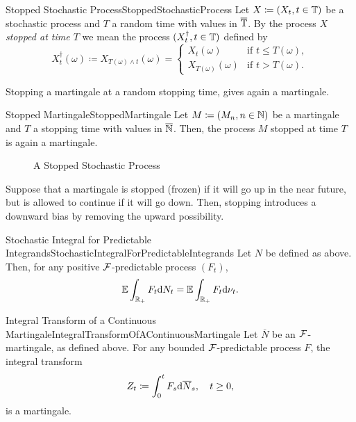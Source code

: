 \begin{defn}{Stopped Stochastic Process}{StoppedStochasticProcess}
	Let \(X \coloneqq (X_t, t \in \mathbb{T})\) be a stochastic process and \(T\) a random time with values in \(\overline{\mathbb{T}}\). By the process \(X\) \emph{stopped at time \(T\)} we mean the process \((X^\dagger_t, t \in \mathbb{T})\) defined by
	\begin{equation}\label{eq:StoppedProcessDefinition}
		X^\dagger_t(\omega) \coloneqq X_{T(\omega) \land t}(\omega) =
		\begin{cases}
			X_t(\omega)           & \text{if } t \le T(\omega), \\
			X_{T(\omega)}(\omega) & \text{if } t > T(\omega).
		\end{cases}
	\end{equation}
\end{defn}

Stopping a martingale at a random stopping time, gives again a martingale.

\begin{thm}{Stopped Martingale}{StoppedMartingale}
	Let \(M \coloneqq (M_n, n \in \mathbb{N})\) be a martingale and \(T\) a stopping time with values in \(\overline{\mathbb{N}}\). Then, the process \(M\) stopped at time \(T\) is again a martingale.
\end{thm}

\begin{figure}[H]
	\hfuzz=20pt\relax
	\centering
	
	\caption[Stopped stochastic process]{A Stopped Stochastic Process}\label{fig:StoppedStochasticProcess}
\end{figure}

Suppose that a martingale is stopped (frozen) if it will go up in the near future, but is allowed to continue if it will go down. Then, stopping introduces a downward bias by removing the upward possibility.

\begin{prop}{Stochastic Integral for Predictable Integrands}{StochasticIntegralForPredictableIntegrands}
	Let \(N\) be defined as above. Then, for any positive \(\mathcal{F}\)-predictable process \((F_t)\),
	\begin{equation}\label{eq:StochasticIntegralExpectation}
		\mathbb{E} \int_{\mathbb{R}_+} F_t \mathrm{d} N_t = \mathbb{E} \int_{\mathbb{R}_+} F_t \mathrm{d} \nu_t.
	\end{equation}
\end{prop}

\begin{thm}{Integral Transform of a Continuous Martingale}{IntegralTransformOfAContinuousMartingale}
	Let \(\overline{N}\) be an \(\mathcal{F}\)-martingale, as defined above. For any bounded \(\mathcal{F}\)-predictable process \(F\), the integral transform
	\begin{equation}\label{eq:ContinuousMartingaleTransform}
		Z_t \coloneqq \int_0^t F_s \mathrm{d} \overline{N}_s, \quad t \ge 0,
	\end{equation}
	is a martingale.
\end{thm}

